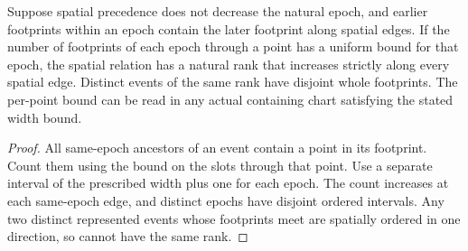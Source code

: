 \begin{proposition}
\label{hir:g8-weak-spatial-rank-chart-epochs}
\leanok
Suppose spatial precedence does not decrease the natural epoch,
and earlier footprints within an epoch contain the later
footprint along spatial edges. If the number of footprints of
each epoch through a point has a uniform bound for that epoch,
the spatial relation has a natural rank that increases strictly
along every spatial edge. Distinct events of the same rank have
disjoint whole footprints. The per-point bound can be read in
any actual containing chart satisfying the stated width bound.
\end{proposition}
\begin{proof}
All same-epoch ancestors of an event contain a point in its
footprint. Count them using the bound on the slots through that
point. Use a separate interval of the prescribed width plus
one for each epoch. The count increases at each same-epoch
edge, and distinct epochs have disjoint ordered intervals.
Any two distinct represented events whose footprints meet are
spatially ordered in one direction, so cannot have the same rank.
\end{proof}


